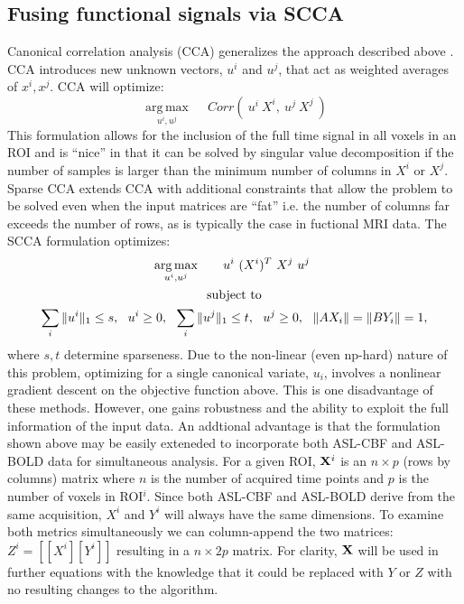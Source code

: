\documentclass{llncs}
\newcommand{\X}{{\bf X}}
\begin{document}
\subsection{Fusing functional signals via SCCA}
Canonical correlation analysis (CCA) generalizes the approach described above \cite{Hotelling1936}.  CCA introduces new unknown vectors, $u^i$ and $u^j$, that act as weighted averages of $x^i, x^j$.  CCA will optimize:
\begin{equation}
\underset{u^i,u^j}{\operatorname{arg\,max}} \quad~ Corr(~u^i~X^i,~u^j~X^j~) 
\end{equation}
This formulation allows for the inclusion of the full time signal in all voxels in an ROI and is ``nice'' in that it can be solved by singular value decomposition if the number of samples is larger than the minimum number of columns in $X^i$ or $X^j$. Sparse CCA extends CCA with additional constraints that allow the problem to be solved even when the input matrices are ``fat'' i.e. the number of columns far exceeds the number of rows, as is typically the case in fuctional MRI data.  The SCCA formulation optimizes: 
\begin{gather*}
\underset{u^i,u^j}{\operatorname{arg\,max}} \quad~ ~~u^i~(X^i)^T ~X^j~u^j~\\ \notag \text{subject to} \\ \notag
\sum_i \|u^i\|_1 \leq s, ~~ u^i \ge 0,~~ \sum_i \|u^j\|_1 \leq t, ~~ u^j \ge 0 , ~~\| A X_i \| = \| B Y_i \| = 1,
\end{gather*}
where $s, t$ determine sparseness.  Due to the non-linear (even np-hard) nature of this problem, optimizing for a single canonical variate, $u_i$, involves a nonlinear gradient descent on the objective function above.  This is one disadvantage of these methods.  However, one gains robustness and the ability to exploit the full information of the input data. An addtional advantage is that the formulation shown above may be easily exteneded to incorporate both ASL-CBF and ASL-BOLD data for simultaneous analysis. For a given ROI, $\X^i$ is an $n \times p$ (rows by columns) matrix where $n$ is the number of acquired time points and $p$ is the number of voxels in ROI$^i$. Since both ASL-CBF and ASL-BOLD derive from the same acquisition, $X^i$ and $Y^i$ will always have the same dimensions. To examine both metrics simultaneously we can column-append the two matrices: $Z^i = \left[ \left[X^i\right] \left[Y^i\right] \right]$ resulting in a $n \times 2p$ matrix. For clarity, $\X$ will be used in further equations with the knowledge that it could be replaced with $Y$ or $Z$ with no resulting changes to the algorithm.
\end{document}

